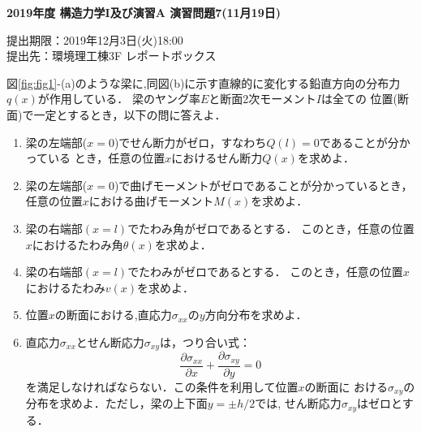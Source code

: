 \documentclass[10pt,a4j]{jarticle}
\newlength{\minitwocolumn}
\begin{document}
\newcommand{\fat}[1]{\mbox{\boldmath $#1$}}
\newcommand{\D}{\partial}
\newcommand{\w}{\omega}
\newcommand{\ga}{\alpha}
\newcommand{\gb}{\beta}
\newcommand{\gx}{\xi}
\newcommand{\gz}{\zeta}
\newcommand{\vhat}[1]{\hat{\fat{#1}}}
\newcommand{\spc}{\vspace{0.7\baselineskip}}
\newcommand{\halfspc}{\vspace{0.3\baselineskip}}

\pagestyle{empty}
\newcommand{\twofig}[2]
 {
   \begin{figure}[here]
     \begin{minipage}[t]{\minitwocolumn}
         \begin{center}   #1
         \end{center}
     \end{minipage}
         \hspace{\columnsep}
     \begin{minipage}[t]{\minitwocolumn}
         \begin{center} #2
         \end{center}
     \end{minipage}
   \end{figure}
 }
\begin{center}
{\Large \bf 2019年度 構造力学I及び演習A 演習問題7(11月19日)} \\
\end{center}
\begin{flushright}
提出期限：2019年12月3日(火)18:00\\
提出先：環境理工棟3F レポートボックス
\end{flushright}
\vspace{15mm}
図\ref{fig:fig1}-(a)のような梁に,同図(b)に示す直線的に変化する鉛直方向の分布力
$q(x)$が作用している． 梁のヤング率$E$と断面2次モーメント$I$は全ての
位置(断面)で一定とするとき，以下の問に答えよ．
\begin{enumerate}
\item
	梁の左端部($x=0$)でせん断力がゼロ，すなわち$Q(l)=0$であることが分かっている
	とき，任意の位置$x$におけるせん断力$Q(x)$を求めよ．
\item
	梁の左端部($x=0$)で曲げモーメントがゼロであることが分かっているとき，
	任意の位置$x$における曲げモーメント$M(x)$を求めよ．
\item
	梁の右端部$\left(x=l\right)$でたわみ角がゼロであるとする．
	このとき，任意の位置$x$におけるたわみ角$\theta(x)$を求めよ．
\item
	梁の右端部$\left(x=l\right)$でたわみがゼロであるとする．
	このとき，任意の位置$x$におけるたわみ$v(x)$を求めよ．
\item
	位置$x$の断面における,直応力$\sigma_{xx}$の$y$方向分布を求めよ．     
\item
	直応力$\sigma_{xx}$とせん断応力$\sigma_{xy}$は，つり合い式：
	\[
		\frac{\partial \sigma_{xx}}{\partial x}
		+
		\frac{\partial \sigma_{xy}}{\partial y}
		=0
	\]
	を満足しなければならない．この条件を利用して位置$x$の断面に
	おける$\sigma_{xy}$の分布を求めよ．ただし，梁の上下面$y=\pm h/2$では, 
	せん断応力$\sigma_{xy}$はゼロとする．
\end{enumerate}
\end{document}
